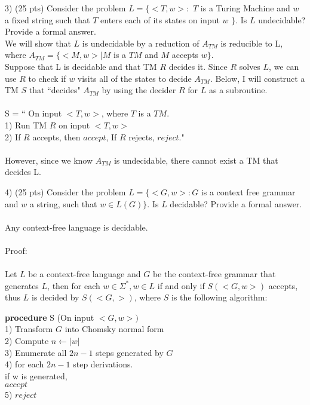 \documentclass{report}
\begin{document}
3) (25 pts) Consider the problem $ L = \{<T,w>: $  $T$ is a Turing Machine and $w$ a fixed string such that $T$ enters each of its states on input $w$    $\}$. Is $L$ undecidable? Provide a formal answer.\\[0.1in] 

We will show that $L$ is undecidable by a reduction of $A_{TM}$ is reducible to L, where $A_{TM} = \{<M,w> | M $ is a $TM$ and $M$ accepts $w\} $. \\  Suppose that L is decidable and that TM $R$ decides it. Since $R$ solves $L$, we can use $R$ to check if $w$ visits all of the states to decide $A_{TM}$. Below, I will construct a TM $S$ that ``decides" $A_{TM}$ by using the decider $R$ for $L$ as a subroutine. \\ \\S = `` On input $<T,w>$, where $T$ is a $TM$.\\
1) Run TM $R$ on input $<T,w>$\\
2) If $R$ accepts, then $accept$, If $R$ rejects, $reject$." \\ \\
However, since we know $A_{TM}$ is undecidable, there cannot exist a TM that decides L. \newpage





4) (25 pts) Consider the problem $L=\{ <G,w>:G$ is a context free grammar and $w$ a string, such that $w\in L(G)\}$. Is $L$ decidable? Provide a formal answer. \\ \\

Any context-free language is decidable.  \\ \\ 
Proof: \\ \\ 
Let $L$ be a context-free language and $G$ be the context-free grammar that generates $L$, then for each $w\in \Sigma^* , w \in L   $ if and only if $S(<G,w>)$ accepts, thus $L$ is decided by $S(<G,>)$, where $S$ is the following algorithm:

\textbf{procedure} S (On input $<G,w>)$ \\
1) Transform $G$ into Chomsky normal form \\
2) Compute $n \leftarrow |w| $ \\
3) Enumerate all $2n-1$ steps generated by $G$ \\
4) for each $2n-1$ step derivations. \\
\indent if w is generated, \\
\indent \indent $accept$ \\
5) $reject$








\end{document}
